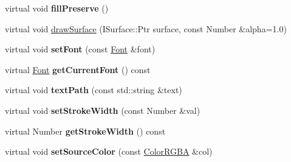 \begin{DoxyCompactItemize}
\item 
\hypertarget{classsambag_1_1disco_1_1_cairo_draw_context_ac04b67ccfbf57cdc6416de5aa37608f3}{
virtual void {\bfseries fillPreserve} ()}
\label{classsambag_1_1disco_1_1_cairo_draw_context_ac04b67ccfbf57cdc6416de5aa37608f3}

\item 
virtual void \hyperlink{classsambag_1_1disco_1_1_cairo_draw_context_a6424563c33b11aa82e0a4bf1324af8c5}{drawSurface} (ISurface::Ptr surface, const Number \&alpha=1.0)
\item 
\hypertarget{classsambag_1_1disco_1_1_cairo_draw_context_aae26d01983dee20a2262313c39e59290}{
virtual void {\bfseries setFont} (const \hyperlink{structsambag_1_1disco_1_1_font}{Font} \&font)}
\label{classsambag_1_1disco_1_1_cairo_draw_context_aae26d01983dee20a2262313c39e59290}

\item 
\hypertarget{classsambag_1_1disco_1_1_cairo_draw_context_a6ca09d9024a0c67eaabebcf44804a83e}{
virtual \hyperlink{structsambag_1_1disco_1_1_font}{Font} {\bfseries getCurrentFont} () const }
\label{classsambag_1_1disco_1_1_cairo_draw_context_a6ca09d9024a0c67eaabebcf44804a83e}

\item 
\hypertarget{classsambag_1_1disco_1_1_cairo_draw_context_ad44e2b793317aea93a426d80560d513c}{
virtual void {\bfseries textPath} (const std::string \&text)}
\label{classsambag_1_1disco_1_1_cairo_draw_context_ad44e2b793317aea93a426d80560d513c}

\item 
\hypertarget{classsambag_1_1disco_1_1_cairo_draw_context_a87d6e19143a5e10fa6b3b21a5bb344d5}{
virtual void {\bfseries setStrokeWidth} (const Number \&val)}
\label{classsambag_1_1disco_1_1_cairo_draw_context_a87d6e19143a5e10fa6b3b21a5bb344d5}

\item 
\hypertarget{classsambag_1_1disco_1_1_cairo_draw_context_a6b42df972503655d703f6b2a80e4ab55}{
virtual Number {\bfseries getStrokeWidth} () const }
\label{classsambag_1_1disco_1_1_cairo_draw_context_a6b42df972503655d703f6b2a80e4ab55}

\item 
\hypertarget{classsambag_1_1disco_1_1_cairo_draw_context_a4a7e48355c5a8648212b75c28331e32f}{
virtual void {\bfseries setSourceColor} (const \hyperlink{structsambag_1_1com_1_1_color_r_g_b_a}{ColorRGBA} \&col)}
\label{classsambag_1_1disco_1_1_cairo_draw_context_a4a7e48355c5a8648212b75c28331e32f}


\end{DoxyCompactItemize}
